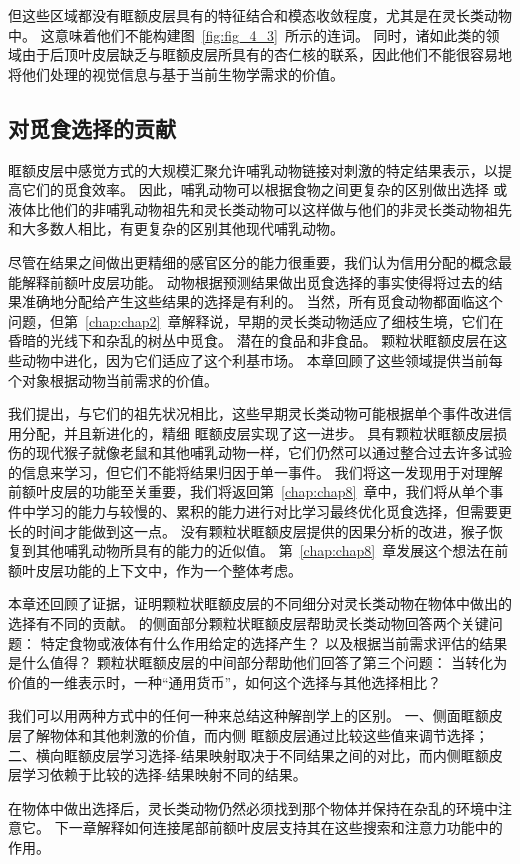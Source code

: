 但这些区域都没有眶额皮层具有的特征结合和模态收敛程度，尤其是在灵长类动物中。
这意味着他们不能构建图~\ref{fig:fig_4_3}~所示的连词。
同时，诸如此类的领域由于后顶叶皮层缺乏与眶额皮层所具有的杏仁核的联系，因此他们不能很容易地将他们处理的视觉信息与基于当前生物学需求的价值。\par



\subsection{对觅食选择的贡献}

眶额皮层中感觉方式的大规模汇聚允许哺乳动物链接对刺激的特定结果表示，以提高它们的觅食效率。
因此，哺乳动物可以根据食物之间更复杂的区别做出选择
或液体比他们的非哺乳动物祖先和灵长类动物可以这样做与他们的非灵长类动物祖先和大多数人相比，有更复杂的区别其他现代哺乳动物。\par


尽管在结果之间做出更精细的感官区分的能力很重要，我们认为信用分配的概念最能解释前额叶皮层功能。
动物根据预测结果做出觅食选择的事实使得将过去的结果准确地分配给产生这些结果的选择是有利的。
当然，所有觅食动物都面临这个问题，但第~\ref{chap:chap2}~章解释说，早期的灵长类动物适应了细枝生境，它们在昏暗的光线下和杂乱的树丛中觅食。
潜在的食品和非食品。
颗粒状眶额皮层在这些动物中进化，因为它们适应了这个利基市场。
本章回顾了这些领域提供当前每个对象根据动物当前需求的价值。\par


我们提出，与它们的祖先状况相比，这些早期灵长类动物可能根据单个事件改进信用分配，并且新进化的，精细 眶额皮层实现了这一进步。
具有颗粒状眶额皮层损伤的现代猴子就像老鼠和其他哺乳动物一样，它们仍然可以通过整合过去许多试验的信息来学习，但它们不能将结果归因于单一事件。
我们将这一发现用于对理解前额叶皮层的功能至关重要，我们将返回第~\ref{chap:chap8}~章中，我们将从单个事件中学习的能力与较慢的、累积的能力进行对比学习最终优化觅食选择，但需要更长的时间才能做到这一点。
没有颗粒状眶额皮层提供的因果分析的改进，猴子恢复到其他哺乳动物所具有的能力的近似值。
第~\ref{chap:chap8}~章发展这个想法在前额叶皮层功能的上下文中，作为一个整体考虑。\par


本章还回顾了证据，证明颗粒状眶额皮层的不同细分对灵长类动物在物体中做出的选择有不同的贡献。
的侧面部分颗粒状眶额皮层帮助灵长类动物回答两个关键问题：
特定食物或液体有什么作用给定的选择产生？
以及根据当前需求评估的结果是什么值得？
颗粒状眶额皮层的中间部分帮助他们回答了第三个问题：
当转化为价值的一维表示时，一种“通用货币”，如何这个选择与其他选择相比？\par


我们可以用两种方式中的任何一种来总结这种解剖学上的区别。 
一、侧面眶额皮层了解物体和其他刺激的价值，而内侧 眶额皮层通过比较这些值来调节选择\cite{noonan2010separate}； 
二、横向眶额皮层学习选择-结果映射取决于不同结果之间的对比，而内侧眶额皮层学习依赖于比较的选择-结果映射不同的结果\cite{rudebeck2011dissociable}。\par


在物体中做出选择后，灵长类动物仍然必须找到那个物体并保持在杂乱的环境中注意它。
下一章解释如何连接尾部前额叶皮层支持其在这些搜索和注意力功能中的作用。\par



